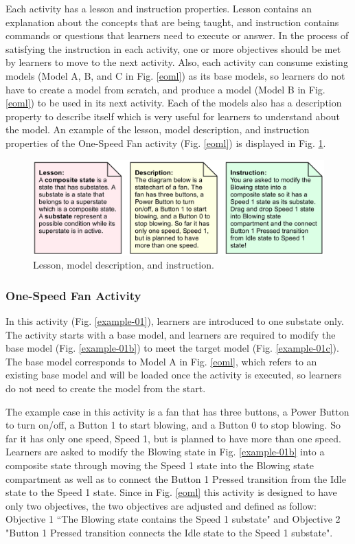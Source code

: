 \documentclass[conference]{IEEEtran}
\begin{document}
Each activity has a lesson and instruction properties. Lesson contains an explanation about the concepts that are being taught, and instruction contains commands or questions that learners need to execute or answer. In the process of satisfying the instruction in each activity, one or more objectives should be met by learners to move to the next activity. Also, each activity can consume existing models (Model A, B, and C in Fig. \ref{eoml}) as its base models, so learners do not have to create a model from scratch, and produce a model (Model B in Fig. \ref{eoml}) to be used in its next activity. Each of the models also has a description property to describe itself which is very useful for learners to understand about the model. An example of the lesson, model description, and instruction properties of the One-Speed Fan activity (Fig. \ref{eoml}) is displayed in Fig. \ref{example-01a}.    

\begin{figure}[!t]
\centering
\includegraphics[width=\linewidth]{example-01a}
\caption{Lesson, model description, and instruction.}
\label{example-01a}
\end{figure}

\subsubsection{One-Speed Fan Activity}
In this activity (Fig. \ref{example-01}), learners are introduced to one substate only. The activity starts with a base model, and learners are required to modify the base model (Fig. \ref{example-01b}) to meet the target model (Fig. \ref{example-01c}). The base model corresponds to Model A in Fig. \ref{eoml}, which refers to an existing base model and will be loaded once the activity is executed, so learners do not need to create the model from the start. 

The example case in this activity is a fan that has three buttons, a Power Button to turn on/off, a Button 1 to start blowing, and a Button 0 to stop blowing. So far it has only one speed, Speed 1, but is planned to have more than one speed. Learners are asked to modify the Blowing state in Fig. \ref{example-01b} into a composite state through moving the Speed 1 state into the Blowing state compartment as well as to connect the Button 1 Pressed transition from the Idle state to the Speed 1 state. Since in Fig. \ref{eoml} this activity is designed to have only two objectives, the two objectives are adjusted and defined as follow: Objective 1 ``The Blowing state contains the Speed 1 substate" and Objective 2 "Button 1 Pressed transition connects the Idle state to the Speed 1 substate".
\end{document}
